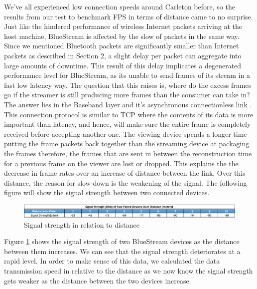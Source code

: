 \documentclass[a4paper,12pt]{article}
\begin{document}
We’ve all experienced low connection speeds around Carleton before, so the results from our test to benchmark FPS in terms of distance came to no surprise. Just like the hindered performance of wireless Internet packets arriving at the host machine, BlueStream is affected by the slow of packets in the same way. Since we mentioned Bluetooth packets are significantly smaller than Internet packets as described in Section 2, a slight delay per packet can aggregate into large amounts of downtime. This result of this delay implicates a degenerated performance level for BlueStream, as its unable to send frames of its stream in a fast low latency way. The question that this raises is, where do the excess frames go if the streamer is still producing more frames than the consumer can take in? The answer lies in the Baseband layer and it’s asynchronous connectionless link \cite{BTUnifyingTheTelecom}. This connection protocol is similar to TCP where the contents of its data is more important than latency, and hence, will make sure the entire frame is completely received before accepting another one. The viewing device spends a longer time putting the frame packets back together than the streaming device at packaging the frames therefore, the frames that are sent in between the reconstruction time for a previous frame on the viewer are lost or dropped. This explains the the decrease in frame rates over an increase of distance between the link. Over this distance, the reason for slow-down is the weakening of the signal. The following figure will show the signal strength between two connected devices.


\begin{figure}[h!]
\centering
\includegraphics[scale=.55]{Figures/Figure15.png}
\caption{Signal strength in relation to distance}
\label{fig:SignalStrength}
\end{figure}

Figure \ref{fig:SignalStrength} shows the signal strength of two BlueStream devices as the distance between them increases. We can see that the signal strength deteriorates at a rapid level. In order to make sense of this data, we calculated the data transmission speed in relative to the distance as we now know the signal strength gets weaker as the distance between the two devices increase.
\end{document}
